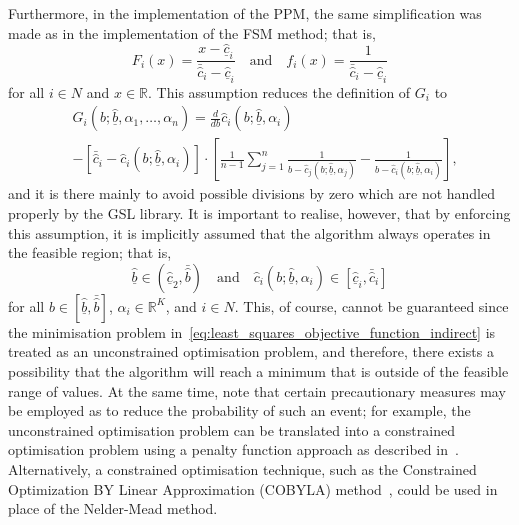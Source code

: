 Furthermore, in the implementation of the PPM, the same simplification was made as in the implementation of the FSM method; that is,
\begin{equation}
  F_i(x) = \frac{x - \underline{\hat{c}}_i}{\bar{\hat{c}}_i - \underline{\hat{c}}_i} \quad\textrm{and}\quad f_i(x) = \frac{1}{\bar{\hat{c}}_i - \underline{\hat{c}}_i}
\end{equation}
for all $i\in N$ and $x\in\mathbb{R}$. This assumption reduces the definition of $G_i$ to
\begin{align}
  &G_i(b; \underline{\hat{b}}, \alpha_1, \dotsc, \alpha_n) = \displaystyle\frac{d}{db}\hat{c}_i(b;\underline{\hat{b}}, \alpha_i)\\\nonumber
  &- \displaystyle\left[ \bar{\hat{c}}_i - \hat{c}_i(b;\underline{\hat{b}}, \alpha_i)\right]\cdot\left[ \frac{1}{n-1}\sum_{j=1}^n\frac{1}{b - \hat{c}_j(b;\underline{\hat{b}}, \alpha_j)} - \frac{1}{b - \hat{c}_i(b;\underline{\hat{b}}, \alpha_i)} \right],
\end{align}
and it is there mainly to avoid possible divisions by zero which are not handled properly by the GSL library. It is important to realise, however, that by enforcing this assumption, it is implicitly assumed that the algorithm always operates in the feasible region; that is,
\begin{equation}
  \underline{\hat{b}}\in (\underline{\hat{c}}_2, \bar{\hat{b}}) \quad\textrm{and}\quad \hat{c}_i(b;\underline{\hat{b}}, \alpha_i)\in [\underline{\hat{c}}_i, \bar{\hat{c}}_i]
\end{equation}
for all $b\in [\underline{\hat{b}}, \bar{\hat{b}}]$, $\alpha_i\in\mathbb{R}^K$, and $i\in N$. This, of course, cannot be guaranteed since the minimisation problem in~\eqref{eq:least_squares_objective_function_indirect} is treated as an unconstrained optimisation problem, and therefore, there exists a possibility that the algorithm will reach a minimum that is outside of the feasible range of values. At the same time, note that certain precautionary measures may be employed as to reduce the probability of such an event; for example, the unconstrained optimisation problem can be translated into a constrained optimisation problem using a penalty function approach as described in~\cite{AvrielPenalty2003}. Alternatively, a constrained optimisation technique, such as the Constrained Optimization BY Linear Approximation (COBYLA) method~\cite{Powell1994}, could be used in place of the Nelder-Mead method.

